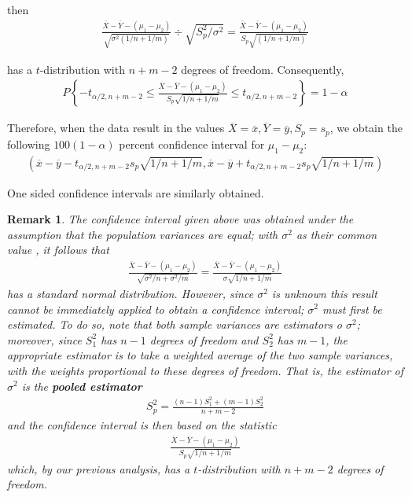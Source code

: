 \documentclass[12pt]{article}
\newtheorem{remark}[theorem]{Remark}
\begin{document}
then
\begin{eqnarray*}
  \frac {\overline{X} - \overline{Y} - (\mu_1 - \mu_2)}
  {\sqrt {\sigma^2 (1 / n + 1 / m)}}
  \div \sqrt{S_p^2 / \sigma^2}
  = \frac {\overline{X} - \overline{Y} - (\mu_1 - \mu_2)}
  {S_p \sqrt { (1 / n + 1 / m)}}
\end{eqnarray*}

has a $t$-distribution with $n+m-2$ degrees of freedom. Consequently,
\begin{eqnarray*}
  P \left\{ - t_{\alpha / 2, n+m-2} \le
    \frac {\overline{X} - \overline{Y} - (\mu_1 - \mu_2)}
    {S_p \sqrt {1 / n + 1 / m}}
    \le t_{\alpha / 2, n+m-2} \right\} = 1 - \alpha
\end{eqnarray*}

Therefore, when the data result in the values $\overline{X} = \overline{x}, \overline{Y} = \overline{y}, S_p = s_p$, we obtain the following $100(1 - \alpha)$ percent confidence interval for $\mu_1 - \mu_2$:
\begin{eqnarray*}
  \left( \overline{x} - \overline{y} - t_{\alpha / 2, n+m-2}
    s_p \sqrt{1/n + 1/m}, \overline{x} - \overline{y} + t_{\alpha / 2, n+m-2}
    s_p \sqrt{1/n + 1/m} \right)
\end{eqnarray*}

One sided confidence intervals are similarly obtained. \\

\begin{remark}
  The confidence interval given above was obtained under the assumption that the population variances are equal; with $\sigma^2$ as their common value , it follows that
  \begin{eqnarray*}
      \frac {\overline{X} - \overline{Y} - (\mu_1 - \mu_2)}
      {\sqrt {\sigma^2 / n + \sigma^2 / m}}
      = \frac {\overline{X} - \overline{Y} - (\mu_1 - \mu_2)}
      {\sigma \sqrt {1 / n + 1 / m}}
  \end{eqnarray*}
  has a standard normal distribution. However, since $\sigma^2$ is unknown this result cannot be immediately applied to obtain a confidence interval; $\sigma^2$ must first be estimated. To do so, note that both sample variances are estimators o $\sigma^2$; moreover, since $S_1^2$ has $n-1$ degrees of freedom and $S_2^2$ has $m-1$, the appropriate estimator is to take a weighted average of the two sample variances, with the weights proportional to these degrees of freedom. That is, the estimator of $\sigma^2$ is the \textbf{pooled estimator}
  \begin{eqnarray*}
    S_p^2 = \frac {(n-1)S_1^2 + (m-1)S_2^2}{n+m-2}
  \end{eqnarray*}
  and the confidence interval is then based on the statistic
  \begin{eqnarray*}
    \frac {\overline{X} - \overline{Y} - (\mu_1 - \mu_2)}
    {S_p \sqrt {1 / n + 1 / m}}
  \end{eqnarray*}
  which, by our previous analysis, has a $t$-distribution with $n+m-2$ degrees of freedom.
\end{remark}
\end{document}
